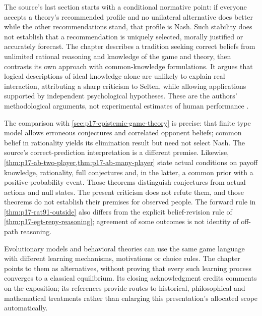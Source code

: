 The source's last section starts with a conditional normative point:
if everyone accepts a theory's recommended profile and no unilateral
alternative does better while the other recommendations stand, that
profile is Nash. Such stability does not establish that a recommendation
is uniquely selected, morally justified or accurately forecast.
The chapter describes a tradition seeking correct beliefs from
unlimited rational reasoning and knowledge of the game and theory,
then contrasts its own approach with common-knowledge formulations.
It argues that logical descriptions of ideal knowledge alone are
unlikely to explain real interaction, attributing a sharp criticism
to Selten, while allowing applications supported by independent
psychological hypotheses. These are the authors' methodological
arguments, not experimental estimates of human performance
\parencite[pp.~540--541]{AlbertKliemt2021ClassicalGameTheory}.

The comparison with \cref{sec:p17-epistemic-game-theory} is precise:
that finite type model allows erroneous conjectures and correlated
opponent beliefs; common belief in rationality yields its elimination
result but need not select Nash. The source's correct-prediction
interpretation is a different premise. Likewise,
\cref{thm:p17-ab-two-player,thm:p17-ab-many-player} state actual
conditions on payoff knowledge, rationality, full conjectures and,
in the latter, a common prior with a positive-probability event.
Those theorems distinguish conjectures from actual actions and
null states. The present criticism does not refute them, and those
theorems do not establish their premises for observed people.
The forward rule in \cref{thm:p17-rat91-outside} also differs from
the explicit belief-revision rule of
\cref{thm:p17-egt-reny-reasoning}; agreement of some outcomes is
not identity of off-path reasoning.

Evolutionary models and behavioral theories can use the same game
language with different learning mechanisms, motivations or choice
rules. The chapter points to them as alternatives, without proving
that every such learning process converges to a classical equilibrium.
Its closing acknowledgment credits comments on the exposition;
its references provide routes to historical, philosophical and
mathematical treatments rather than enlarging this presentation's
allocated scope automatically.


